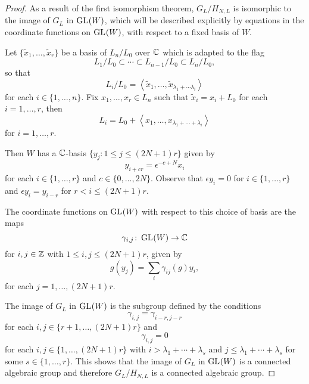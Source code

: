 \documentclass[a4paper, 11pt]{report}
\begin{document}
\begin{proof}
As a result of the first isomorphism theorem, $G_L/{H_{N,L}}$ is isomorphic to the image of $G_L$ in $\operatorname{GL}_{}(W)$, which will be described explicitly by equations in the coordinate functions on $\operatorname{GL}_{}(W)$, with respect to a fixed basis of $W$.

Let $\{\tilde{x}_1,\ldots,\tilde{x}_r\}$ be a basis of $L_n/{L_0}$ over $\mathbb{C}$ which is adapted to the flag
\begin{equation*}
L_1/{L_0}\subset\cdots\subset L_{n-1}/{L_0}\subset L_n/{L_0},
\end{equation*}
so that
\begin{equation*}
L_i/{L_0} = \left\langle \tilde{x}_1,\ldots,\tilde{x}_{\lambda_1+\cdots\lambda_i}\right\rangle
\end{equation*}
for each $i\in\{1,\ldots,n\}$. Fix $x_1,\ldots,x_r\in L_n$ such that $\tilde{x}_i=x_i+L_0$ for each $i=1,\ldots,r$, then
\begin{equation*}
L_i = L_0 + \left\langle x_1,\ldots,x_{\lambda_1+\cdots +\lambda_i}\right\rangle
\end{equation*}
for $i=1,\ldots,r$.

Then $W$ has a $\mathbb{C}$-basis $\{y_j:1\le j\le (2N+1)r\}$ given by
\begin{equation*}
y_{i+cr} = \epsilon^{-c+N}x_i
\end{equation*}
for each $i\in\{1,\ldots,r\}$ and $c\in\{0,\ldots,2N\}$. Observe that $\epsilon y_i = 0$ for $i\in\{1,\ldots,r\}$ and $\epsilon y_i = y_{i-r}$ for $r<i\le (2N+1)r$.

The coordinate functions on $\operatorname{GL}_{}(W)$ with respect to this choice of basis are
the maps
\begin{equation*}
\gamma_{i,j}\colon\operatorname{GL}_{}(W)\to\mathbb{C}
\end{equation*}
for $i,j\in\mathbb{Z}$ with $1\le i,j\le (2N+1)r$, given by
\begin{equation*}
g(y_j) = \sum_i \gamma_{ij}(g)y_i,
\end{equation*}
for each $j=1,\ldots,(2N+1)r$.

The image of $G_L$ in $\operatorname{GL}_{}(W)$ is the subgroup defined by the conditions
\begin{equation*}
\gamma_{i,j} = \gamma_{i-r,j-r}
\end{equation*}
for each $i,j\in\{r+1,\ldots, (2N+1)r\}$ and
\begin{equation*}
\gamma_{i,j} = 0
\end{equation*}
for each $i,j\in\{1,\ldots,(2N+1)r\}$ with $i>\lambda_1+\cdots +\lambda_s$ and $j\le \lambda_1+\cdots +\lambda_s$ for some $s\in\{1,\ldots,r\}$. This shows that the image of $G_L$ in $\operatorname{GL}_{}(W)$ is a connected algebraic group and therefore $G_L/{H_{N,L}}$ is a connected algebraic group.


\end{proof}
\end{document}

